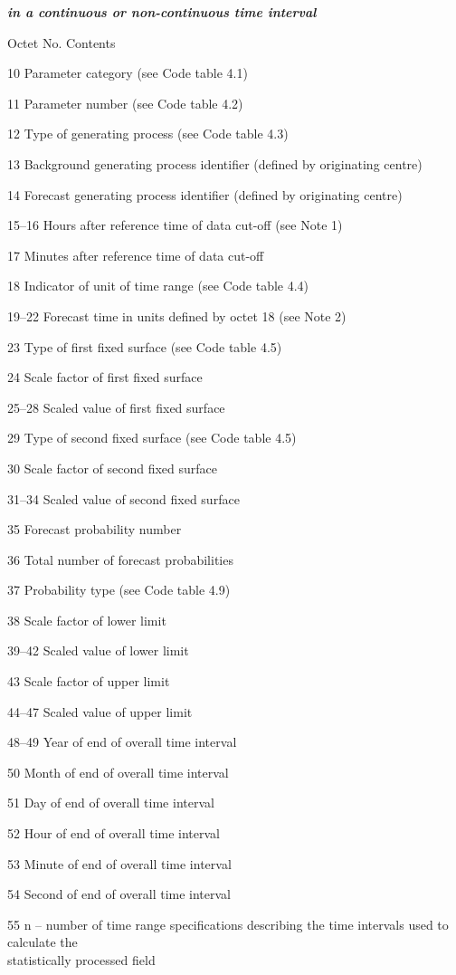 \emph{\textbf{in a continuous or non-continuous time interval}}

Octet No. Contents

10 Parameter category (see Code table 4.1)

11 Parameter number (see Code table 4.2)

12 Type of generating process (see Code table 4.3)

13 Background generating process identifier (defined by originating centre)

14 Forecast generating process identifier (defined by originating centre)

15--16 Hours after reference time of data cut-off (see Note 1)

17 Minutes after reference time of data cut-off

18 Indicator of unit of time range (see Code table 4.4)

19--22 Forecast time in units defined by octet 18 (see Note 2)

23 Type of first fixed surface (see Code table 4.5)

24 Scale factor of first fixed surface

25--28 Scaled value of first fixed surface

29 Type of second fixed surface (see Code table 4.5)

30 Scale factor of second fixed surface

31--34 Scaled value of second fixed surface

35 Forecast probability number

36 Total number of forecast probabilities

37 Probability type (see Code table 4.9)

38 Scale factor of lower limit

39--42 Scaled value of lower limit

43 Scale factor of upper limit

44--47 Scaled value of upper limit

48--49 Year of end of overall time interval

50 Month of end of overall time interval

51 Day of end of overall time interval

52 Hour of end of overall time interval

53 Minute of end of overall time interval

54 Second of end of overall time interval

55 n -- number of time range specifications describing the time intervals used to calculate the\\
statistically processed field

